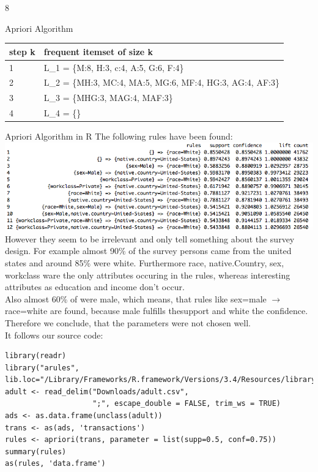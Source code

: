 \documentclass{article}
\begin{document}
\begin{ukon-infie}[10.01.18]{8}
\begin{exercise}[p=5]{Apriori Algorithm}
{\begin{tabular}{|l|l|}
\hline
step k & frequent itemset of size k                                \\ \hline
1      & L\_1 = \{M:8, H:3, c:4, A:5, G:6, F:4\}                   \\ \hline
2      & L\_2 = \{MH:3, MC:4, MA:5, MG:6, MF:4, HG:3, AG:4, AF:3\} \\ \hline
3      & L\_3 = \{MHG:3, MAG:4, MAF:3\}                            \\ \hline
4      & L\_4 = \{\}                                               \\ \hline
\end{tabular}
}
		\end{exercise}
		
		\begin{exercise}[p=4]{Apriori Algorithm in R}
		The following rules have been found:\\
		\includegraphics[scale=0.6]{apriori_results.png}
		However they seem to be irrelevant and only tell something about the survey design. For example almost 90\% of the survey persons came from the united states and around 85\% were white. Furthermore race, native.Country, sex, workclass ware the only attributes occuring in the rules, whereas interesting attributes as education and income don't occur.\\
		Also almost 60\% of were male, which means, that rules like sex=male $\rightarrow$ race=white are found, because male fulfills thesupport and white the confidence. \\Therefore we conclude, that the parameters were not chosen well.\\
		It follows our source code:
		\end{exercise}
		\begin{verbatim}
library(readr)
library("arules", lib.loc="/Library/Frameworks/R.framework/Versions/3.4/Resources/library")
adult <- read_delim("Downloads/adult.csv", 
                    ";", escape_double = FALSE, trim_ws = TRUE)
ads <- as.data.frame(unclass(adult))
trans <- as(ads, 'transactions')
rules <- apriori(trans, parameter = list(supp=0.5, conf=0.75))
summary(rules)
as(rules, 'data.frame')
		\end{verbatim}
		

\end{ukon-infie}
\end{document}
